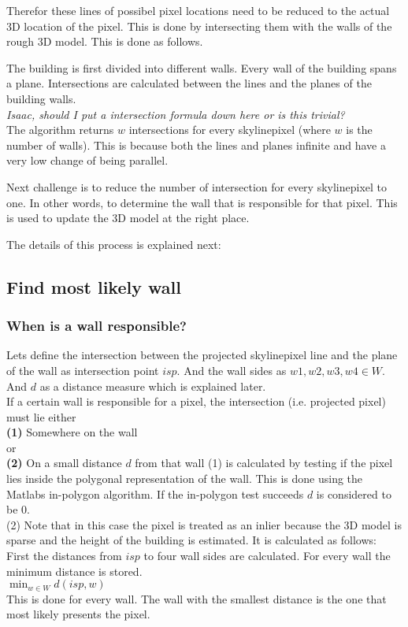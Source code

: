\documentclass[10pt]{article}
\begin{document}
Therefor these lines of possibel pixel locations need to
be reduced to the actual 3D location of the pixel.  This is done by intersecting
them with the walls of the rough 3D model.  This is done as follows.

The building is first divided into different walls.  Every wall of the building spans a plane. 
Intersections are calculated between the lines and the planes of the building walls.\\
\textit{Isaac, should I put a intersection formula down here or is this trivial?}\\

The algorithm returns $w$ intersections for every skylinepixel (where $w$ is the number of walls).
This is because both the lines and planes infinite and have a very low change of
being parallel.

Next challenge is to reduce the number of intersection for every skylinepixel
to one. In other words, to determine the wall that is responsible for that pixel. 
This is used to update the 3D model at the right place.

The details of this process is explained next:

\subsection{Find most likely wall}
\subsubsection{When is a wall responsible?}
Lets define the intersection between the projected skylinepixel line and the
plane of the wall as intersection point $isp$. And the wall sides as ${w1, w2,
w3, w4 \in W}$. And $d$ as a distance measure which is explained later.\\ 
If a certain wall is responsible for a pixel, the intersection (i.e. projected
pixel) must lie either\\

\textbf{(1)} Somewhere on the wall 
\\
or
\\
\textbf{(2)} On a small distance $d$ from that wall
(1) is calculated by testing if the pixel lies inside the polygonal
representation of the wall. This is done using the Matlabs in-polygon
algorithm. If the in-polygon test succeeds $d$ is considered to be 0.\\

(2) Note that in this case the pixel is treated as an inlier because the 3D
model is sparse and the height of the building is estimated. It is 
calculated as follows: \\
First the distances from $isp$ to four wall sides are calculated.
For every wall the minimum distance is stored.\\
$\min_{w\in W} d(isp, w)$\\
This is done for every wall. The wall with the smallest distance is the one that
most likely presents the pixel.\\
\end{document}
